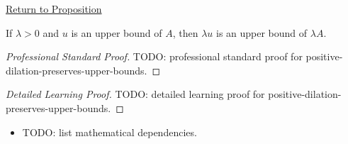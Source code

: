 \newpage
{}
\label{prf:positive-dilation-preserves-upper-bounds}

\begin{remark*}[Return]
\hyperref[prop:positive-dilation-preserves-upper-bounds]{Return to Proposition}
\end{remark*}

\begin{proposition*}
If $\lambda>0$ and $u$ is an upper bound of $A$, then $\lambda u$ is an
upper bound of $\lambda A$.
\end{proposition*}

\begin{proof}[Professional Standard Proof]
\LRAProofBodyStart
TODO: professional standard proof for positive-dilation-preserves-upper-bounds.
\end{proof}

\begin{proof}[Detailed Learning Proof]
\LRAProofBodyStart
TODO: detailed learning proof for positive-dilation-preserves-upper-bounds.
\end{proof}

\begin{remark*}
\end{remark*}

\begin{dependencies}
\begin{itemize}
  \item TODO: list mathematical dependencies.
\end{itemize}
\end{dependencies}

\clearpage
